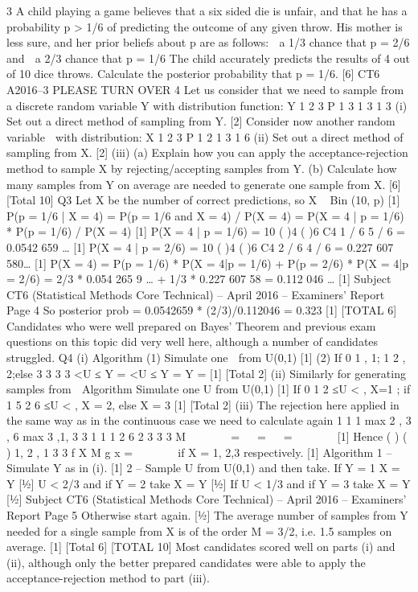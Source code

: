 3 A child playing a game believes that a six sided die is unfair, and that he has a
probability p > 1/6 of predicting the outcome of any given throw. His mother is less
sure, and her prior beliefs about p are as follows:
   a 1/3 chance that p = 2/6 and
 a 2/3 chance that p = 1/6
The child accurately predicts the results of 4 out of 10 dice throws.
Calculate the posterior probability that p = 1/6. [6]
CT6 A2016–3 PLEASE TURN OVER
4 Let us consider that we need to sample from a discrete random variable Y with
distribution function:
  Y 1 2 3
P 1
3 1
3 1
3
(i) Set out a direct method of sampling from Y. [2]
Consider now another random variable 􀜺 with distribution:
  X 1 2 3
P 1
2 1
3 1
6
(ii) Set out a direct method of sampling from X. [2]
(iii) (a) Explain how you can apply the acceptance-rejection method to
sample X by rejecting/accepting samples from Y.
(b) Calculate how many samples from Y on average are needed to
generate one sample from X. [6]
[Total 10]
Q3 Let X be the number of correct predictions, so X ~ Bin (10, p) [1]
P(p = 1/6 | X = 4) = P(p = 1/6 and X = 4) / P(X = 4)
= P(X = 4 | p = 1/6) * P(p = 1/6) / P(X = 4) [1]
P(X = 4 | p = 1/6) = 10 ( )4 ( )6
C4 1 / 6 5 / 6 = 0.0542 659 … [1]
P(X = 4 | p = 2/6) = 10 ( )4 ( )6
C4 2 / 6 4 / 6 = 0.227 607 580… [1]
P(X = 4) = P(p = 1/6) * P(X = 4|p = 1/6) + P(p = 2/6) * P(X = 4|p = 2/6)
= 2/3 * 0.054 265 9 … + 1/3 * 0.227 607 58
= 0.112 046 … [1]
Subject CT6 (Statistical Methods Core Technical) – April 2016 – Examiners’ Report
Page 4
So posterior prob = 0.0542659 * (2/3)/0.112046 = 0.323 [1]
[TOTAL 6]
Candidates who were well prepared on Bayes’ Theorem and previous exam
questions on this topic did very well here, although a number of candidates
struggled.
Q4 (i) Algorithm
(1) Simulate one 􀜷 from U(0,1) [1]
(2) If 0 1 , 1; 1 2 , 2;else 3
3 3 3
<U ≤ Y = <U ≤ Y = Y = [1]
[Total 2]
(ii) Similarly for generating samples from 􀜺
Algorithm
Simulate one U from U(0,1) [1]
If 0 1
2
≤U < , X=1 ; if 1 5
2 6
≤U < , X = 2, else X = 3 [1]
[Total 2]
(iii) The rejection here applied in the same way as in the continuous case we need
to calculate again
1 1 1
max 2 , 3 , 6 max 3 ,1, 3 3 1 1 1 2 6 2
3 3 3
M
 
    =   =   =
     
 
[1]
Hence ( )
( )
1, 2 , 1
3 3
f X
M g x
=    
 
if X = 1, 2,3 respectively. [1]
Algorithm
1 – Simulate Y as in (i). [1]
2 – Sample U from U(0,1) and then take.
If Y = 1 X = Y [½]
U < 2/3 and if Y = 2 take X = Y [½]
If U < 1/3 and if Y = 3 take X = Y [½]
Subject CT6 (Statistical Methods Core Technical) – April 2016 – Examiners’ Report
Page 5
Otherwise start again. [½]
The average number of samples from Y needed for a single sample from X is
of the order M = 3/2, i.e. 1.5 samples on average. [1]
[Total 6]
[TOTAL 10]
Most candidates scored well on parts (i) and (ii), although only the better
prepared candidates were able to apply the acceptance-rejection method to
part (iii).
